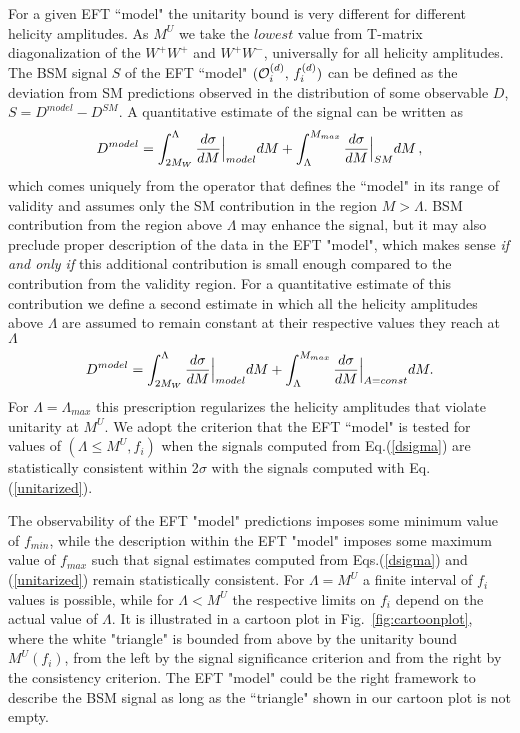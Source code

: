 For a given EFT ``model" the unitarity bound is very different for  different helicity amplitudes.
As  $M^U$ we take  the $lowest$ value from T-matrix diagonalization of the $W^+W^+$ and $W^+W^-$, universally for all helicity 
amplitudes. 
The BSM signal  $S$ of the EFT ``model" $({\cal O}_i^{(d)},\,f_i^{(d)})$ 
can be defined as the deviation from SM predictions observed in the distribution of some observable $D$,  
$S=D^{model}-D^{SM}$.
A quantitative estimate of the signal can be written as
\small
\begin{equation} 
D^{model}=\int^{\Lambda}_{2M_W}\frac{d\sigma}{dM} \Bigl|_{model} dM +\int_{\Lambda}^{M_{max}}\frac{d\sigma}{dM}\Bigr|_{SM} dM\,,
\label{dsigma}
\end{equation}
\normalsize
which comes uniquely from the operator that defines the ``model" in its range
of validity and assumes only the SM contribution in the region $M>\Lambda$.
BSM contribution from the region above $\Lambda$   may enhance the signal, but it may also 
preclude proper description of the data in the EFT  "model",
which makes sense {\it if and only if} this additional contribution is small enough  
compared to the contribution from the validity region.  
For a  quantitative estimate of this 
contribution we define a second estimate in which  all the helicity amplitudes above 
$\Lambda$ are assumed to remain 
constant at their respective values they reach at $\Lambda$
\small
\begin{equation}
D^{model}=\int^{\Lambda}_{2M_W}\frac{d\sigma}{dM}\Bigl|_{model} dM +\int_{\Lambda}^{M_{max}}\frac{d\sigma}{dM}\Bigr|_{A=const} dM.
\label{unitarized}
\end{equation}
\normalsize
For $\Lambda = \Lambda_{max}$ this prescription regularizes the helicity amplitudes that violate unitarity at $M^U$. 
We adopt the criterion that the EFT ``model" is tested for values of $(\Lambda\leq M^U, f_i)$ 
when the signals computed from Eq.(\ref{dsigma}) are statistically consistent 
within 2$\sigma$ with the signals computed with Eq.(\ref{unitarized}).

The observability of  the EFT "model" predictions imposes some minimum value of $f_{min}$, while the description within the EFT "model" imposes some 
maximum value of $f_{max}$ such that signal
estimates computed from Eqs.(\ref{dsigma}) and (\ref{unitarized}) remain 
statistically consistent.  
For $\Lambda=M^U$ a finite interval of $f_i$ values is possible, while 
for $\Lambda <M^U$ the  respective limits on $f_i$  depend on the actual value of $\Lambda$. It is illustrated in 
a cartoon plot in Fig.~\ref{fig:cartoonplot}, where the white "triangle" is bounded from 
above by the unitarity bound $M^U(f_i)$, from the left by the signal significance criterion 
and from the right by the consistency criterion.
The EFT "model" could be the right framework to describe the  BSM signal as long as the ``triangle"
shown in our cartoon plot is not empty.  






